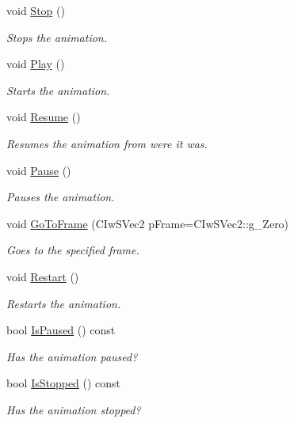 \begin{DoxyCompactItemize}
void \hyperlink{class_ty_sprite_a685d7feb600841f57b9f0f3934ec1f41}{Stop} ()
\begin{DoxyCompactList}\small\item\em Stops the animation. \end{DoxyCompactList}\item 
void \hyperlink{class_ty_sprite_a90356a1ca0bd9e24329761d854727f87}{Play} ()
\begin{DoxyCompactList}\small\item\em Starts the animation. \end{DoxyCompactList}\item 
void \hyperlink{class_ty_sprite_aab5e82483c1613a880a5db858874e4da}{Resume} ()
\begin{DoxyCompactList}\small\item\em Resumes the animation from were it was. \end{DoxyCompactList}\item 
void \hyperlink{class_ty_sprite_a91a6b7c5172d1fcc2b8d122f1d1c963a}{Pause} ()
\begin{DoxyCompactList}\small\item\em Pauses the animation. \end{DoxyCompactList}\item 
void \hyperlink{class_ty_sprite_abc3b33d6e1da2e784397a2096da755bd}{GoToFrame} (CIwSVec2 pFrame=CIwSVec2::g\_\-Zero)
\begin{DoxyCompactList}\small\item\em Goes to the specified frame. \end{DoxyCompactList}\item 
void \hyperlink{class_ty_sprite_a69d95d3c47b80e114c0bfc990ccf8640}{Restart} ()
\begin{DoxyCompactList}\small\item\em Restarts the animation. \end{DoxyCompactList}\item 
bool \hyperlink{class_ty_sprite_a9f9aa6c34aeef7ef1499fa6130a50e3d}{IsPaused} () const 
\begin{DoxyCompactList}\small\item\em Has the animation paused? \end{DoxyCompactList}\item 
bool \hyperlink{class_ty_sprite_ab61aeed8022f01644bf192cd7f10daa5}{IsStopped} () const 
\begin{DoxyCompactList}\small\item\em Has the animation stopped? \end{DoxyCompactList}\item 

\end{DoxyCompactItemize}
